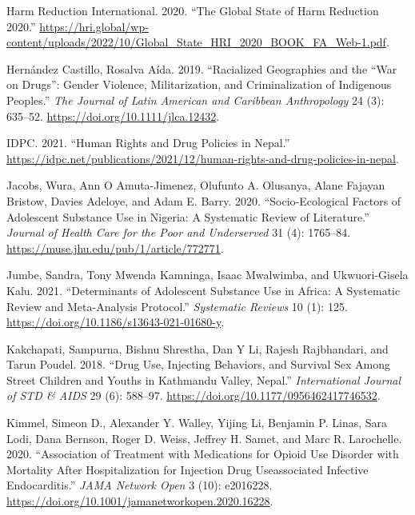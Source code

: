 \documentclass[
  letterpaper,
  DIV=11,
  numbers=noendperiod]{scrartcl}
\newlength{\cslhangindent}
\newenvironment{CSLReferences}[2] %
 {\begin{list}{}{%
  \setlength{\itemindent}{0pt}
  \setlength{\leftmargin}{0pt}
  \setlength{\parsep}{0pt}
  \ifodd #1
   \setlength{\leftmargin}{\cslhangindent}
   \setlength{\itemindent}{-1\cslhangindent}
  \fi
  \setlength{\itemsep}{#2\baselineskip}}}
 {\end{list}}
\begin{document}
\begin{CSLReferences}{1}{0}
Harm Reduction International. 2020. {``The Global State of Harm
Reduction 2020.''}
\url{https://hri.global/wp-content/uploads/2022/10/Global_State_HRI_2020_BOOK_FA_Web-1.pdf}.

Hernández Castillo, Rosalva Aída. 2019. {``Racialized Geographies and
the {``}War on Drugs{''}: Gender Violence, Militarization, and
Criminalization of Indigenous Peoples.''} \emph{The Journal of Latin
American and Caribbean Anthropology} 24 (3): 635--52.
\url{https://doi.org/10.1111/jlca.12432}.

IDPC. 2021. {``Human Rights and Drug Policies in Nepal.''}
\url{https://idpc.net/publications/2021/12/human-rights-and-drug-policies-in-nepal}.

Jacobs, Wura, Ann O Amuta-Jimenez, Olufunto A. Olusanya, Alane Fajayan
Bristow, Davies Adeloye, and Adam E. Barry. 2020. {``Socio-Ecological
Factors of Adolescent Substance Use in Nigeria: A Systematic Review of
Literature.''} \emph{Journal of Health Care for the Poor and
Underserved} 31 (4): 1765--84.
\url{https://muse.jhu.edu/pub/1/article/772771}.

Jumbe, Sandra, Tony Mwenda Kamninga, Isaac Mwalwimba, and Ukwuori-Gisela
Kalu. 2021. {``Determinants of Adolescent Substance Use in Africa: A
Systematic Review and Meta-Analysis Protocol.''} \emph{Systematic
Reviews} 10 (1): 125. \url{https://doi.org/10.1186/s13643-021-01680-y}.

Kakchapati, Sampurna, Bishnu Shrestha, Dan Y Li, Rajesh Rajbhandari, and
Tarun Poudel. 2018. {``Drug Use, Injecting Behaviors, and Survival Sex
Among Street Children and Youths in Kathmandu Valley, Nepal.''}
\emph{International Journal of STD \& AIDS} 29 (6): 588--97.
\url{https://doi.org/10.1177/0956462417746532}.

Kimmel, Simeon D., Alexander Y. Walley, Yijing Li, Benjamin P. Linas,
Sara Lodi, Dana Bernson, Roger D. Weiss, Jeffrey H. Samet, and Marc R.
Larochelle. 2020. {``Association of Treatment with Medications for
Opioid Use Disorder with Mortality After Hospitalization for Injection
Drug Use{\textendash}associated Infective Endocarditis.''} \emph{JAMA
Network Open} 3 (10): e2016228.
\url{https://doi.org/10.1001/jamanetworkopen.2020.16228}.


\end{CSLReferences}
\end{document}
